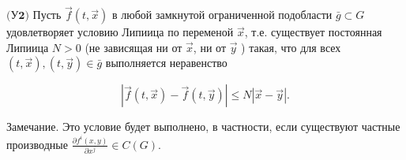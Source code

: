 $\textbf{(У2)}$ Пусть $\vec{f}(t, \vec{x})$ в любой замкнутой ограниченной подобласти $\bar{g} \subset G$ удовлетворяет условию Липиица по переменой $\vec{x}$, т.е. существует постоянная Липиица $N>0$ (не зависящая ни от $\vec{x}$, ни от $\vec{y}$ ) такая, что для всех $(t, \vec{x}),(t, \vec{y}) \in \bar{g}$ выполняется неравенство

$$
|\vec{f}(t, \vec{x})-\vec{f}(t, \vec{y})| \leq N|\vec{x}-\vec{y}| .
$$

$\textbf{Замечание.}$ Это условие будет выполнено, в частности, если существуют частные производные $\frac{\partial f^{i}(x, y)}{\partial x^{j}} \in C(G) .$


 
